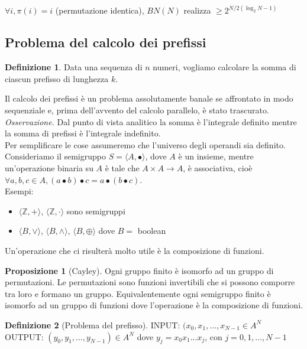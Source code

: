 \documentclass[a4paper,portrait,12pt]{article}
\theoremstyle{definition}
\newtheorem{definition}{Definizione}[section]
\newtheorem{proposition}{Proposizione}
\begin{document}
$\forall i, \pi(i) = i$ (permutazione identica), $BN(N)$ realizza $\ge 2^{N/2 (\log_2 N - 1)}$

\subsection{Problema del calcolo dei prefissi}

\begin{definition}
Data una sequenza di $n$ numeri, vogliamo calcolare la somma di ciascun prefisso di lunghezza $k$.
\end{definition}

Il calcolo dei prefissi è un problema assolutamente banale se affrontato in modo sequenziale e, prima dell'avvento del calcolo parallelo, è stato trascurato.\\

\textit{Osservazione.} Dal punto di vista analitico la somma è l'integrale definito mentre la somma di prefissi è l'integrale indefinito.\\

Per semplificare le cose assumeremo che l'universo degli operandi sia definito.\\

Consideriamo il semigruppo $S = \langle A,\bullet \rangle$, dove $A$ è un insieme, mentre un’operazione binaria su $A$ è tale che $A \times A \to A$, è associativa, cioè $\forall a,b,c \in A, (a \bullet b) \bullet c = a \bullet (b \bullet c)$.\\

Esempi:
\begin{itemize}
\item $\langle \mathbb{Z},+ \rangle$, $\langle \mathbb{Z}, \cdot \rangle$ sono semigruppi
\item $\langle B, \vee \rangle$, $\langle B, \wedge \rangle$, $\langle B, \oplus \rangle$ dove $B = $ boolean
\end{itemize}

Un’operazione che ci risulterà molto utile è la composizione di funzioni.

\begin{proposition}[Cayley] Ogni gruppo finito è isomorfo ad un gruppo di permutazioni. Le permutazioni sono funzioni invertibili che si possono comporre tra loro e formano un gruppo.
Equivalentemente ogni semigruppo finito è isomorfo ad un gruppo di funzioni dove l’operazione è la composizione di funzioni.
\end{proposition}

\begin{definition}[Problema del prefisso]
INPUT: $(x_0,x_1,...,x_{N-1} \in A^N$\\
OUTPUT: $(y_0,y_1,...,y_{N-1}) \in A^N$ dove $y_j = x_0x_1...x_j$, con $j=0,1,...,N-1$\\
\end{definition}
\end{document}
